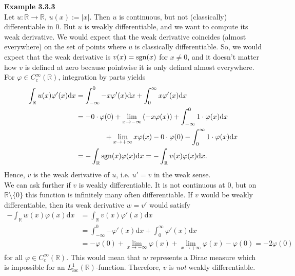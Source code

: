 \textbf{Example 3.3.3}\\
Let $u:\mathbb{R}\longrightarrow\mathbb{R}$, $u(x):=\lvert x\rvert$. Then $u$ is continuous, but not (classically) differentiable in 0. But $u$ is weakly differentiable, and we want to compute its weak derivative. We would expect that the weak derivative coincides (almost everywhere) on the set of points where $u$ is classically differentiable. So, we would expect that the weak derivative is $v(x)=\operatorname{sgn}\mathopen{}\left(x\right)\mathclose{}$ for $x\ne0$, and it doesn't matter how $v$ is defined at zero because pointwise it is only defined almost everywhere. For $\varphi\in C_c^\infty(\mathbb{R})$, integration by parts yields
\begin{align*}
	\int_\mathbb{R}{u(x)\varphi'(x)\mathrm{d}x}&=\int_{-\infty}^0{-x\varphi'(x)\mathrm{d}x}+\int_0^\infty{x\varphi'(x)\mathrm{d}x}\\
	&=-0\cdot\varphi(0)+\lim_{x\to-\infty}{(-x\varphi(x))}+\int_{-\infty}^0{1\cdot\varphi(x)\mathrm{d}x}\\
	&\qquad\qquad+\lim_{x\to+\infty}{x\varphi(x)}-0\cdot\varphi(0)-\int_0^\infty{1\cdot\varphi(x)\mathrm{d}x}\\
	&=-\int_\mathbb{R}{\operatorname{sgn}\mathopen{}\left(x\right)\mathclose{}\varphi(x)\mathrm{d}x}=-\int_\mathbb{R}{v(x)\varphi(x)\mathrm{d}x}.
\end{align*}
Hence, $v$ is the weak derivative of $u$, i.e. $u'=v$ in the weak sense.\\

We can ask further if $v$ is weakly differentiable. It is not continuous at 0, but on $\mathbb{R}\setminus\{0\}$ this function is infinitely many often differentiable. If $v$ would be weakly differentiable, then its weak derivative $w=v'$ would satisfy
\begin{align*}
	-\int_\mathbb{R}{w(x)\varphi(x)\mathrm{d}x}&=\int_\mathbb{R}{v(x)\varphi'(x)\mathrm{d}x}\\
	&=\int_{-\infty}^0{-\varphi'(x)\mathrm{d}x}+\int_0^\infty{\varphi'(x)\mathrm{d}x}\\
	&=-\varphi(0)+\lim_{x\to-\infty}{\varphi(x)}+\lim_{x\to+\infty}{\varphi(x)}-\varphi(0)=-2\varphi(0)
\end{align*}
for all $\varphi\in C_c^\infty(\mathbb{R})$. This would mean that $w$ represents a Dirac measure which is impossible for an $L_\text{loc}^1(\mathbb{R})$-function. Therefore, $v$ is \textit{not} weakly differentiable.\\[11pt]


